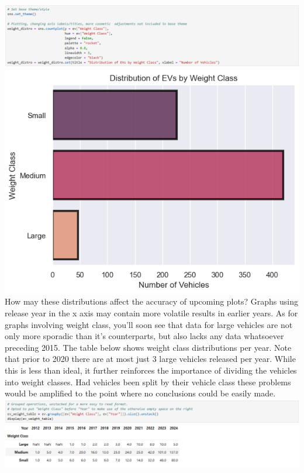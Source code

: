 \documentclass{article}
\begin{document}
{  \newline \newline
  \includegraphics[width=\textwidth]{code_04.png}
  \includegraphics[width=\textwidth]{graph_02.png}
  How may these distributions affect the accuracy of upcoming plots? Graphs using release year in the x axis may contain more
  volatile results in earlier years. As for graphs involving weight class, you'll soon see that data for large vehicles are
  not only more sporadic than it's counterparts, but also lacks any data whatsoever preceding 2015. The table below shows
  weight class distributions per year. Note that prior to 2020 there are at most just 3 large vehicles released per year. While
  this is less than ideal, it further reinforces the importance of dividing the vehicles into weight classes. Had vehicles been
  split by their vehicle class these problems would be amplified to the point where no conclusions could be easily made.
  \newpage
  \includegraphics[width=\textwidth]{table_02.png}
}
\end{document}
